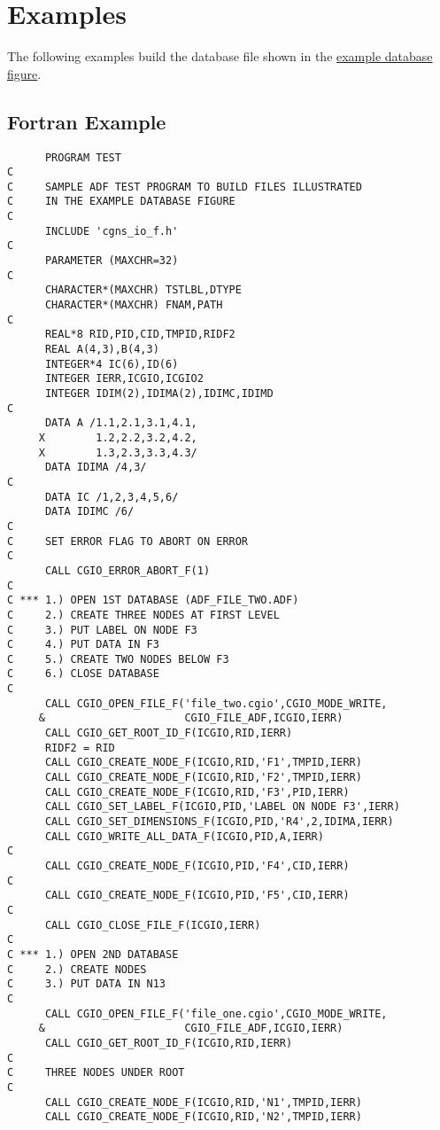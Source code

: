 \section{Examples}
\label{s:misc}

The following examples build the database file shown in the
\hyperlink{f:figure}{example database figure}.

\subsection{Fortran Example} \label{s:Fortran}

\begin{verbatim}
      PROGRAM TEST
C
C     SAMPLE ADF TEST PROGRAM TO BUILD FILES ILLUSTRATED
C     IN THE EXAMPLE DATABASE FIGURE
C
      INCLUDE 'cgns_io_f.h'
C
      PARAMETER (MAXCHR=32)
C
      CHARACTER*(MAXCHR) TSTLBL,DTYPE
      CHARACTER*(MAXCHR) FNAM,PATH
C
      REAL*8 RID,PID,CID,TMPID,RIDF2
      REAL A(4,3),B(4,3)
      INTEGER*4 IC(6),ID(6)
      INTEGER IERR,ICGIO,ICGIO2
      INTEGER IDIM(2),IDIMA(2),IDIMC,IDIMD
C
      DATA A /1.1,2.1,3.1,4.1,
     X        1.2,2.2,3.2,4.2,
     X        1.3,2.3,3.3,4.3/
      DATA IDIMA /4,3/
C
      DATA IC /1,2,3,4,5,6/
      DATA IDIMC /6/
C
C     SET ERROR FLAG TO ABORT ON ERROR
C
      CALL CGIO_ERROR_ABORT_F(1)
C
C *** 1.) OPEN 1ST DATABASE (ADF_FILE_TWO.ADF)
C     2.) CREATE THREE NODES AT FIRST LEVEL
C     3.) PUT LABEL ON NODE F3
C     4.) PUT DATA IN F3
C     5.) CREATE TWO NODES BELOW F3
C     6.) CLOSE DATABASE
C
      CALL CGIO_OPEN_FILE_F('file_two.cgio',CGIO_MODE_WRITE,
     &                      CGIO_FILE_ADF,ICGIO,IERR)
      CALL CGIO_GET_ROOT_ID_F(ICGIO,RID,IERR)
      RIDF2 = RID
      CALL CGIO_CREATE_NODE_F(ICGIO,RID,'F1',TMPID,IERR)
      CALL CGIO_CREATE_NODE_F(ICGIO,RID,'F2',TMPID,IERR)
      CALL CGIO_CREATE_NODE_F(ICGIO,RID,'F3',PID,IERR)
      CALL CGIO_SET_LABEL_F(ICGIO,PID,'LABEL ON NODE F3',IERR)
      CALL CGIO_SET_DIMENSIONS_F(ICGIO,PID,'R4',2,IDIMA,IERR)
      CALL CGIO_WRITE_ALL_DATA_F(ICGIO,PID,A,IERR)
C
      CALL CGIO_CREATE_NODE_F(ICGIO,PID,'F4',CID,IERR)
C
      CALL CGIO_CREATE_NODE_F(ICGIO,PID,'F5',CID,IERR)
C
      CALL CGIO_CLOSE_FILE_F(ICGIO,IERR)
C
C *** 1.) OPEN 2ND DATABASE
C     2.) CREATE NODES
C     3.) PUT DATA IN N13
C
      CALL CGIO_OPEN_FILE_F('file_one.cgio',CGIO_MODE_WRITE,
     &                      CGIO_FILE_ADF,ICGIO,IERR)
      CALL CGIO_GET_ROOT_ID_F(ICGIO,RID,IERR)
C
C     THREE NODES UNDER ROOT
C
      CALL CGIO_CREATE_NODE_F(ICGIO,RID,'N1',TMPID,IERR)
      CALL CGIO_CREATE_NODE_F(ICGIO,RID,'N2',TMPID,IERR)

\end{verbatim}
